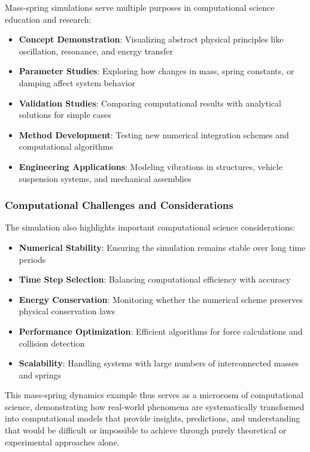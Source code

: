 Mass-spring simulations serve multiple purposes in computational science education and research:

\begin{itemize}
  \item \textbf{Concept Demonstration}: Visualizing abstract physical principles like oscillation, resonance, and energy transfer
  \item \textbf{Parameter Studies}: Exploring how changes in mass, spring constants, or damping affect system behavior
  \item \textbf{Validation Studies}: Comparing computational results with analytical solutions for simple cases
  \item \textbf{Method Development}: Testing new numerical integration schemes and computational algorithms
  \item \textbf{Engineering Applications}: Modeling vibrations in structures, vehicle suspension systems, and mechanical assemblies
\end{itemize}

\subsubsection{Computational Challenges and Considerations}

The simulation also highlights important computational science considerations:

\begin{itemize}
  \item \textbf{Numerical Stability}: Ensuring the simulation remains stable over long time periods
  \item \textbf{Time Step Selection}: Balancing computational efficiency with accuracy
  \item \textbf{Energy Conservation}: Monitoring whether the numerical scheme preserves physical conservation laws
  \item \textbf{Performance Optimization}: Efficient algorithms for force calculations and collision detection
  \item \textbf{Scalability}: Handling systems with large numbers of interconnected masses and springs
\end{itemize}

This mass-spring dynamics example thus serves as a microcosm of computational science, demonstrating how real-world phenomena are systematically transformed into computational models that provide insights, predictions, and understanding that would be difficult or impossible to achieve through purely theoretical or experimental approaches alone.

